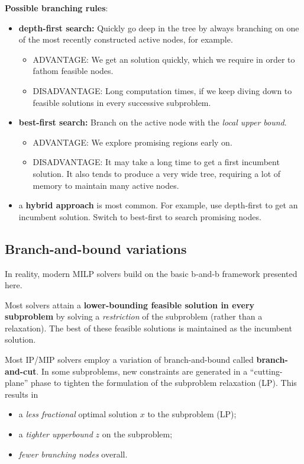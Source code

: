 \documentclass[11pt]{article}
\theoremstyle{definition}
\newcommand{\answerbox}[3]{%
  \fbox{%
    \begin{minipage}[#1]{#2}
      \hfill\vspace{#3}
    \end{minipage}
  }
}
\newcommand{\wordbox}{\answerbox{c}{1.2in}{.7cm}}
\begin{document}
\begin{tcolorbox}
\textbf{Possible branching rules}: 
\begin{itemize}
\item \textbf{depth-first search:} Quickly go deep in the tree by always branching on one of the most recently constructed active nodes, for example.
	\begin{itemize}
		\item ADVANTAGE:  We get an \wordbox solution quickly, which we require in order to fathom feasible nodes.
		\item DISADVANTAGE:  Long computation times, if we keep diving down to feasible solutions in every successive subproblem.
	\end{itemize}
\item \textbf{best-first search:} Branch on the active node with the \wordbox \emph{local upper bound}.
	\begin{itemize}
		\item ADVANTAGE:  We explore promising regions early on.
		\item DISADVANTAGE:  It may take a long time to get a first incumbent solution.  It also tends to produce a very wide tree, requiring a lot of memory to maintain many active nodes.
	\end{itemize}
\item a \textbf{hybrid approach} is most common.  For example, use depth-first to get an incumbent solution.  Switch to best-first to search promising nodes.  
\end{itemize}
\end{tcolorbox}

\newpage\phantom{1}

\subsection{Branch-and-bound variations}
In reality, modern MILP solvers build on the basic b-and-b framework presented here.

Most solvers attain a \textbf{lower-bounding feasible solution in every subproblem} by solving a \emph{restriction} of the subproblem (rather than a relaxation).  The best of these feasible solutions is maintained as the incumbent solution.

Most IP/MIP solvers employ a variation of branch-and-bound called \textbf{branch-and-cut}.  In some subproblems, new constraints are generated in a ``cutting-plane'' phase to tighten the formulation of the subproblem relaxation (LP).  This results in 
	\begin{itemize}
		\item a \emph{less fractional} optimal solution $x$ to the subproblem (LP);
		\item a \emph{tighter upperbound} $z$ on the subproblem;
		\item \emph{fewer branching nodes} overall.
	\end{itemize}
\end{document}
